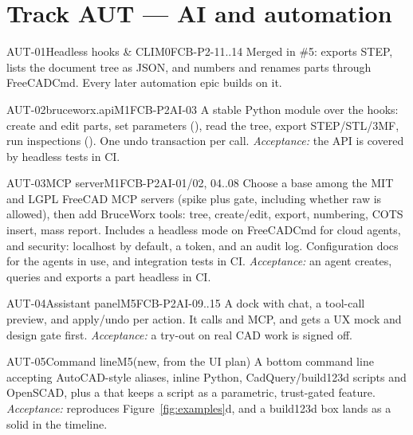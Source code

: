 \section{Track AUT --- AI and automation}\label{sec:aut}

\begin{epic}{AUT-01}{Headless hooks \& CLI}{M0}{\stDone}{FCB-P2-11..14}
Merged in \#5:  exports STEP, lists the document tree as JSON, and
numbers and renames parts through FreeCADCmd. Every later automation epic builds on it.
\end{epic}

\begin{epic}{AUT-02}{bruceworx.api}{M1}{\stTodo}{FCB-P2AI-03}
A stable Python module over the hooks: create and edit parts, set parameters (), read the tree,
export STEP/STL/3MF, run inspections (). One undo transaction per call.
\emph{Acceptance:} the API is covered by headless tests in CI.
\end{epic}

\begin{epic}{AUT-03}{MCP server}{M1}{\stTodo}{FCB-P2AI-01/02, 04..08}
Choose a base among the MIT and LGPL FreeCAD MCP servers (spike plus gate, including whether raw
 is allowed), then add BruceWorx tools: tree, create/edit, export, numbering, COTS
insert, mass report. Includes a headless mode on FreeCADCmd for cloud agents, and security: localhost by
default, a token, and an audit log. Configuration docs for the agents in use, and integration tests in CI.
\emph{Acceptance:} an agent creates, queries and exports a part headless in CI.
\end{epic}

\begin{epic}{AUT-04}{Assistant panel}{M5}{\stTodo}{FCB-P2AI-09..15}
A dock with chat, a tool-call preview, and apply/undo per action. It calls  and MCP, and
gets a UX mock and design gate first.
\emph{Acceptance:} a try-out on real CAD work is signed off.
\end{epic}

\begin{epic}{AUT-05}{Command line}{M5}{\stTodo}{(new, from the UI plan)}
A bottom command line accepting AutoCAD-style aliases, inline Python, CadQuery/build123d scripts and
OpenSCAD, plus a  that keeps a script as a parametric, trust-gated feature.
\emph{Acceptance:}  reproduces Figure~\ref{fig:examples}d, and a build123d box lands
as a solid in the timeline.
\end{epic}

